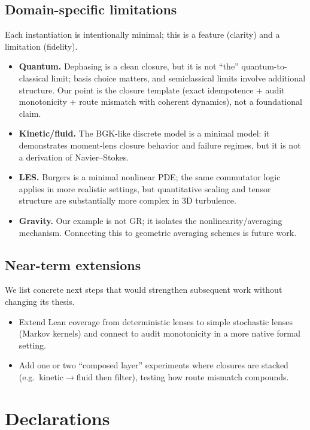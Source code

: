 \documentclass[11pt]{article}
\begin{document}
\subsection{Domain-specific limitations}
Each instantiation is intentionally minimal; this is a feature (clarity) and a limitation (fidelity).
\begin{itemize}
  \item \textbf{Quantum.} Dephasing is a clean closure, but it is not ``the'' quantum-to-classical limit; basis choice matters, and semiclassical limits involve additional structure. Our point is the closure template (exact idempotence + audit monotonicity + route mismatch with coherent dynamics), not a foundational claim.

  \item \textbf{Kinetic/fluid.} The BGK-like discrete model is a minimal model: it demonstrates moment-lens closure behavior and failure regimes, but it is not a derivation of Navier--Stokes.

  \item \textbf{LES.} Burgers is a minimal nonlinear PDE; the same commutator logic applies in more realistic settings, but quantitative scaling and tensor structure are substantially more complex in 3D turbulence.

  \item \textbf{Gravity.} Our example is not GR; it isolates the nonlinearity/\linebreak averaging mechanism. Connecting this to geometric averaging schemes is future work.
\end{itemize}

\subsection{Near-term extensions}
We list concrete next steps that would strengthen subsequent work without changing its thesis.
\begin{itemize}
  \item Extend Lean coverage from deterministic lenses to simple stochastic lenses (Markov kernels) and connect to audit monotonicity in a more native formal setting.
  \item Add one or two ``composed layer'' experiments where closures are stacked (e.g.\ kinetic$\to$fluid then filter), testing how route mismatch compounds.
\end{itemize}

\section*{Declarations}
\end{document}
